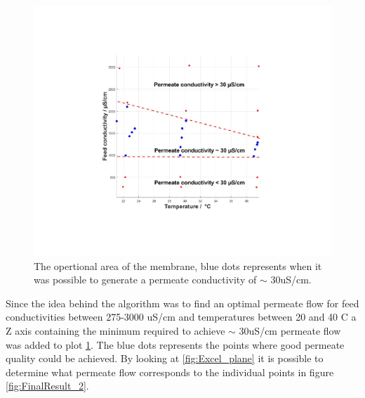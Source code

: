 \begin{figure}[H]
    \centering
    \includegraphics[width=1.1\textwidth]{FinalResult_1}
    \caption{The opertional area of the membrane, blue dots represents when it was possible to generate a permeate conductivity of $\sim$ 30uS/cm.}
    \label{fig:FinalResult_1}
\end{figure}

\newpage

Since the idea behind the algorithm was to find an optimal permeate flow for feed conductivities between 275-3000 uS/cm and temperatures between 20 and 40 C a Z axis containing the minimum required to achieve $\sim$ 30uS/cm permeate flow was added to plot \ref{fig:FinalResult_1}. The blue dots represents the points where good permeate quality could be achieved. By looking at  \ref{fig:Excel_plane} it is possible to determine what permeate flow corresponds to the individual points in figure  \ref{fig:FinalResult_2}.

